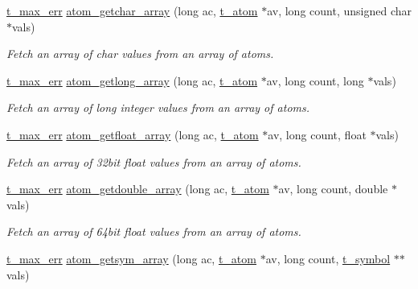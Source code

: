 \begin{DoxyCompactItemize}
\hyperlink{group__datatypes_ga73edaae82b318855cc09fac994918165}{t\_\-max\_\-err} \hyperlink{group__atom_ga76ec2c6ff61e5bb4e29e51f1a791db56}{atom\_\-getchar\_\-array} (long ac, \hyperlink{structt__atom}{t\_\-atom} $\ast$av, long count, unsigned char $\ast$vals)
\begin{DoxyCompactList}\small\item\em Fetch an array of char values from an array of atoms. \item\end{DoxyCompactList}\item 
\hyperlink{group__datatypes_ga73edaae82b318855cc09fac994918165}{t\_\-max\_\-err} \hyperlink{group__atom_ga0bb78863f0f99d492b5241c9158b10cc}{atom\_\-getlong\_\-array} (long ac, \hyperlink{structt__atom}{t\_\-atom} $\ast$av, long count, long $\ast$vals)
\begin{DoxyCompactList}\small\item\em Fetch an array of long integer values from an array of atoms. \item\end{DoxyCompactList}\item 
\hyperlink{group__datatypes_ga73edaae82b318855cc09fac994918165}{t\_\-max\_\-err} \hyperlink{group__atom_ga0d3bc27f1de1bacbd8026c81a7b7e3d3}{atom\_\-getfloat\_\-array} (long ac, \hyperlink{structt__atom}{t\_\-atom} $\ast$av, long count, float $\ast$vals)
\begin{DoxyCompactList}\small\item\em Fetch an array of 32bit float values from an array of atoms. \item\end{DoxyCompactList}\item 
\hyperlink{group__datatypes_ga73edaae82b318855cc09fac994918165}{t\_\-max\_\-err} \hyperlink{group__atom_ga4189a7d83f7cf03d575425ba97f0e9f9}{atom\_\-getdouble\_\-array} (long ac, \hyperlink{structt__atom}{t\_\-atom} $\ast$av, long count, double $\ast$vals)
\begin{DoxyCompactList}\small\item\em Fetch an array of 64bit float values from an array of atoms. \item\end{DoxyCompactList}\item 
\hyperlink{group__datatypes_ga73edaae82b318855cc09fac994918165}{t\_\-max\_\-err} \hyperlink{group__atom_ga48c3655238debe58e8a943dc28381953}{atom\_\-getsym\_\-array} (long ac, \hyperlink{structt__atom}{t\_\-atom} $\ast$av, long count, \hyperlink{structt__symbol}{t\_\-symbol} $\ast$$\ast$vals)
$$
\end{DoxyCompactItemize}
